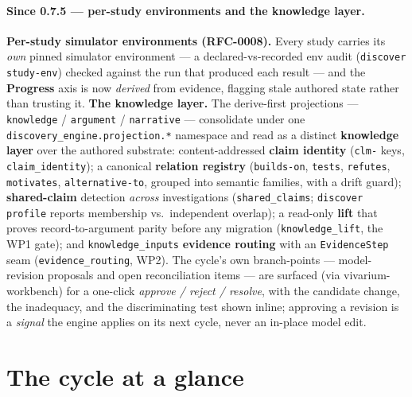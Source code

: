 \documentclass[11pt]{article}
\newcommand{\code}[1]{\texttt{\small #1}}
\begin{document}
\paragraph{Since 0.7.5 --- per-study environments and the knowledge layer.} \textbf{Per-study
simulator environments (RFC-0008).} Every study carries its \emph{own} pinned simulator environment ---
a declared-vs-recorded env audit (\code{discover study-env}) checked against the run that produced each
result --- and the \textbf{Progress} axis is now \emph{derived} from evidence, flagging stale authored
state rather than trusting it. \textbf{The knowledge layer.} The derive-first projections ---
\code{knowledge} / \code{argument} / \code{narrative} --- consolidate under one
\code{discovery\_engine.projection.*} namespace and read as a distinct \textbf{knowledge layer} over the
authored substrate: content-addressed \textbf{claim identity} (\code{clm-} keys, \code{claim\_identity});
a canonical \textbf{relation registry} (\code{builds-on}, \code{tests}, \code{refutes}, \code{motivates},
\code{alternative-to}, grouped into semantic families, with a drift guard); \textbf{shared-claim}
detection \emph{across} investigations (\code{shared\_claims}; \code{discover profile} reports
membership vs.\ independent overlap); a read-only \textbf{lift} that proves record-to-argument parity
before any migration (\code{knowledge\_lift}, the WP1 gate); and \code{knowledge\_inputs} \textbf{evidence
routing} with an \code{EvidenceStep} seam (\code{evidence\_routing}, WP2). The cycle's own branch-points
--- model-revision proposals and open reconciliation items --- are surfaced (via vivarium-workbench) for
a one-click \emph{approve / reject / resolve}, with the candidate change, the inadequacy, and the
discriminating test shown inline; approving a revision is a \emph{signal} the engine applies on its next
cycle, never an in-place model edit.

\section{The cycle at a glance}
\end{document}
